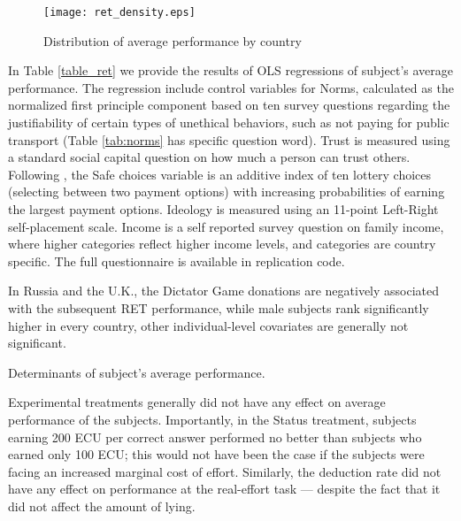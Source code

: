 \documentclass[12pt]{article}
\begin{document}
\begin{figure}[!htb]
\centerline{\texttt{[image: ret\_density.eps]}}
\caption{Distribution of average performance by country}\label{fig:correct_sums}
\end{figure}



In Table \ref{table_ret} we provide the results of OLS regressions of subject's average performance. The regression include control variables for Norms, calculated as the normalized first principle component based on ten survey questions regarding the justifiability of certain types of unethical behaviors, such as not paying for public transport (Table \ref{tab:norms} has specific question word). Trust is measured using a standard social capital question on how much a person can trust others. Following \cite{Holtetal2002}, the Safe choices variable is an additive index of ten lottery choices (selecting between two payment options) with increasing probabilities of earning the largest payment options. Ideology is measured using an 11-point Left-Right self-placement scale. Income is a self reported survey question on family income, where higher categories reflect higher income levels, and categories are country specific. The full questionnaire is available in replication code.    

In Russia and the U.K., the Dictator Game donations are negatively associated with the subsequent RET performance, while male subjects rank significantly higher in every country, other individual-level covariates are generally not significant.

\begin{table}[ht]
\scriptsize
\begin{center}

\end{center}
\caption{Determinants of subject's average performance.}
\label{table_ret}
\end{table}

Experimental treatments generally did not have any effect on average performance of the subjects. Importantly, in the Status treatment, subjects earning 200 ECU per correct answer performed no better than subjects who earned only 100 ECU; this would not have been the case if the subjects were facing an increased marginal cost of effort. Similarly, 
the deduction rate did not have any effect on performance at the real-effort task --- despite the fact that it did not affect the amount of lying. 
\end{document}
